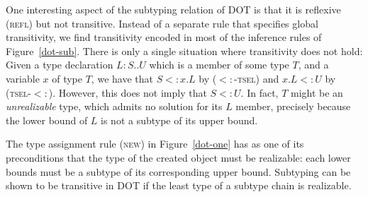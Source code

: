 \documentclass{llncs}
\newcommand{\sub}{<:}
\newcommand{\Ldecl}[3]{#1 : #2..#3}%
\begin{document}
One interesting aspect of the subtyping relation of DOT is that it is
reflexive (\textsc{refl}) but not transitive. Instead of a separate
rule that specifies global transitivity, we find transitivity encoded
in most of the inference rules of Figure~\ref{dot-sub}. There is only
a single situation where transitivity does not hold:  Given a type
declaration $\Ldecl L S U$ which is a member of some type $T$, and a
variable $x$ of type $T$, we have that $S \sub x.L$ by
(\textsc{$\sub$-tsel}) and $x.L \sub U$ by (\textsc{tsel-$\sub$}).
However, this does not imply that $S \sub U$. In fact, 
$T$ might be an {\em unrealizable} type, which admits no solution for
its $L$ member, precisely because the lower bound of $L$ is not a
subtype of its upper bound.

The type assignment rule (\textsc{new}) in Figure~\ref{dot-one}
has as one of its preconditions that the type of
the created object must be realizable: each lower bounds must be a subtype
of its corresponding upper bound. Subtyping can be shown to be transitive in DOT if the
least type of a subtype chain is realizable.
\end{document}
